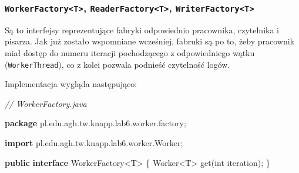 \documentclass[11pt]{article}
\newenvironment{Shaded}{}{}
\newcommand{\KeywordTok}[1]{\textcolor[rgb]{0.00,0.44,0.13}{\textbf{{#1}}}}
\newcommand{\DataTypeTok}[1]{\textcolor[rgb]{0.56,0.13,0.00}{{#1}}}
\newcommand{\CommentTok}[1]{\textcolor[rgb]{0.38,0.63,0.69}{\textit{{#1}}}}
\newcommand{\FunctionTok}[1]{\textcolor[rgb]{0.02,0.16,0.49}{{#1}}}
\newcommand{\NormalTok}[1]{{#1}}
\newcommand{\ImportTok}[1]{{#1}}
\newcommand{\OperatorTok}[1]{\textcolor[rgb]{0.40,0.40,0.40}{{#1}}}
\begin{document}
    \hypertarget{workerfactoryt-readerfactoryt-writerfactoryt}{%
\subsubsection{\texorpdfstring{\texttt{WorkerFactory\textless{}T\textgreater{}},
\texttt{ReaderFactory\textless{}T\textgreater{}},
\texttt{WriterFactory\textless{}T\textgreater{}}}{WorkerFactory\textless T\textgreater, ReaderFactory\textless T\textgreater, WriterFactory\textless T\textgreater{}}}\label{workerfactoryt-readerfactoryt-writerfactoryt}}

Są to interfejsy reprezentujące fabryki odpowiednio pracownika,
czytelnika i pisarza. Jak już zostało wspomniane wcześniej, fabruki są
po to, żeby pracownik miał dostęp do numeru iteracji pochodzącego z
odpowiedniego wątku (\texttt{WorkerThread}), co z kolei pozwala podnieść
czytelność logów.

Implementacja wygląda następująco:

\begin{Shaded}
\begin{Highlighting}[]
\CommentTok{// WorkerFactory.java}

\KeywordTok{package}\ImportTok{ pl}\OperatorTok{.}\ImportTok{edu}\OperatorTok{.}\ImportTok{agh}\OperatorTok{.}\ImportTok{tw}\OperatorTok{.}\ImportTok{knapp}\OperatorTok{.}\ImportTok{lab6}\OperatorTok{.}\ImportTok{worker}\OperatorTok{.}\ImportTok{factory}\OperatorTok{;}

\KeywordTok{import} \ImportTok{pl}\OperatorTok{.}\ImportTok{edu}\OperatorTok{.}\ImportTok{agh}\OperatorTok{.}\ImportTok{tw}\OperatorTok{.}\ImportTok{knapp}\OperatorTok{.}\ImportTok{lab6}\OperatorTok{.}\ImportTok{worker}\OperatorTok{.}\ImportTok{Worker}\OperatorTok{;}

\KeywordTok{public} \KeywordTok{interface}\NormalTok{ WorkerFactory}\OperatorTok{\textless{}}\NormalTok{T}\OperatorTok{\textgreater{}} \OperatorTok{\{}
\NormalTok{    Worker}\OperatorTok{\textless{}}\NormalTok{T}\OperatorTok{\textgreater{}} \FunctionTok{get}\OperatorTok{(}\DataTypeTok{int}\NormalTok{ iteration}\OperatorTok{);}
\OperatorTok{\}}
\end{Highlighting}
\end{Shaded}
\end{document}
